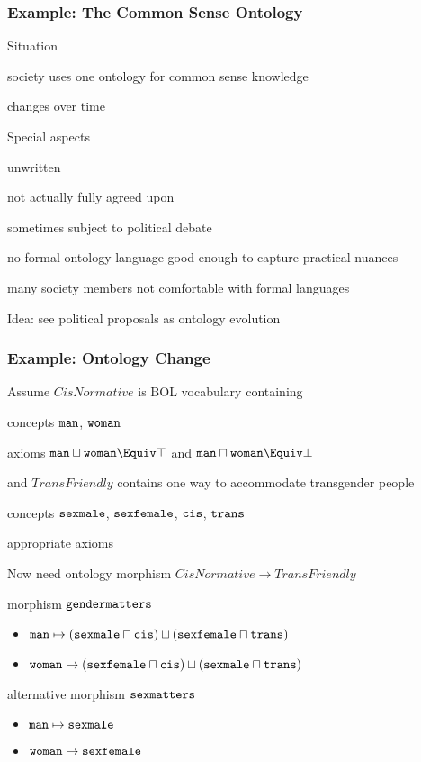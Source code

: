 \begin{frame}\frametitle{Example: The Common Sense Ontology}
\begin{blockitems}{Situation}
\item society uses one ontology for common sense knowledge
\item changes over time
\end{blockitems}

\begin{blockitems}{Special aspects}
\item unwritten
\item not actually fully agreed upon
\item sometimes subject to political debate
\item no formal ontology language good enough to capture practical nuances
\item many society members not comfortable with formal languages
\end{blockitems}

Idea: see political proposals as ontology evolution
\end{frame}

\begin{frame}[fragile]\frametitle{Example: Ontology Change}
\begin{blockitems}{Assume $CisNormative$ is BOL vocabulary containing}
\item concepts $\cn{man}$, $\cn{woman}$
\item axioms $\cn{man}\sqcup\cn{woman}\Equiv \top$ and $\cn{man}\sqcap\cn{woman}\Equiv \bot$
\end{blockitems}

\begin{blockitems}{and $TransFriendly$ contains \hfill\small one way to accommodate transgender people}
\item concepts $\cn{sexmale}$, $\cn{sexfemale}$, $\cn{cis}$, $\cn{trans}$
\item appropriate axioms
\end{blockitems}

\begin{blockitems}{Now need ontology morphism $CisNormative \to TransFriendly$}
\item morphism $\cn{gendermatters}$
 \begin{itemize}
 \item $\cn{man}\mapsto (\cn{sexmale}\sqcap\cn{cis})\sqcup (\cn{sexfemale}\sqcap\cn{trans})$
 \item $\cn{woman}\mapsto (\cn{sexfemale}\sqcap\cn{cis})\sqcup (\cn{sexmale}\sqcap\cn{trans})$
 \end{itemize}
\item alternative morphism $\cn{sexmatters}$
 \begin{itemize}
 \item $\cn{man}\mapsto \cn{sexmale}$
 \item $\cn{woman}\mapsto \cn{sexfemale}$
 \end{itemize}
\end{blockitems}
\end{frame}

